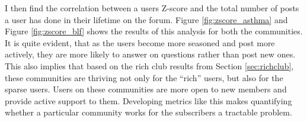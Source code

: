 \begin{figure}[!ht]
    \centering
    \caption{  }
\end{figure}

I then find the correlation between a users Z-score and the total number of posts a user has done in their lifetime on the forum. Figure \ref{fig:zscore_asthma} and Figure \ref{fig:zscore_blf} shows the results of this analysis for both the communities. It is quite evident, that as the users become more seasoned and post more actively, they are more likely to answer on questions rather than post new ones. This also implies that based on the rich club results from Section \ref{sec:richclub}, these communities are thriving not only for the ``rich'' users, but also for the sparse users. Users on these communities are more open to new members and provide active support to them. 
Developing metrics like this makes quantifying whether a particular community works for the subscribers a tractable problem.


